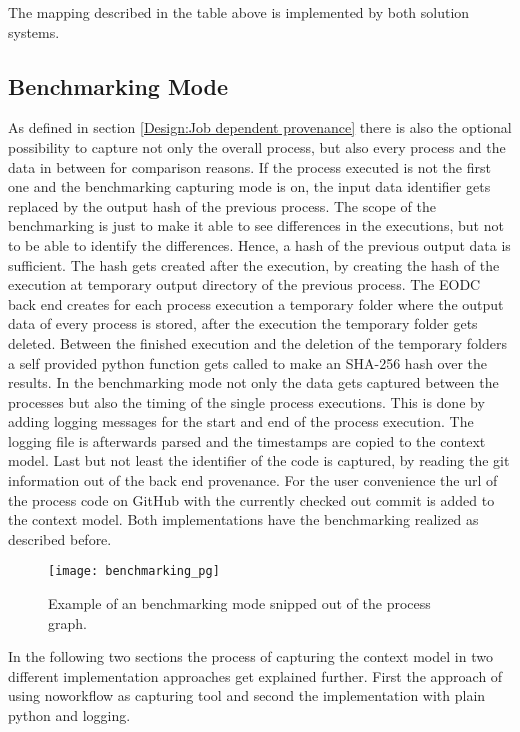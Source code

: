 \documentclass[draft,final]{vutinfth} %
\begin{document}
The mapping described in the table above is implemented by both solution systems. 

\subsection{Benchmarking Mode}\label{Implementation:Benchmarking Mode}
As defined in section \ref{Design:Job dependent provenance} there is also the optional possibility to capture not only the overall process, but also every process and the data in between for comparison reasons. 
If the process executed is not the first one and the benchmarking capturing mode is on, the input data identifier gets replaced by the output hash of the previous process. The scope of the benchmarking is just to make it able to see differences in the executions, but not to be able to identify the differences. Hence, a hash of the previous output data is sufficient. The hash gets created after the execution, by creating the hash of the execution at temporary output directory of the previous process. The EODC back end creates for each process execution a temporary folder where the output data of every process is stored, after the execution the temporary folder gets deleted. Between the finished execution and the deletion of the temporary folders a self provided python function gets called to make an SHA-256 hash over the results. In the benchmarking mode not only the data gets captured between the processes but also the timing of the single process executions. This is done by adding logging messages for the start and end of the process execution. The logging file is afterwards parsed and the timestamps are copied to the context model. Last but not least the identifier of the code is captured, by reading the git information out of the back end provenance. For the user convenience the url of the process code on GitHub with the currently checked out commit is added to the context model. Both implementations have the benchmarking realized as described before.    

\begin{figure}[h]
	\centering
	\texttt{[image: benchmarking\_pg]}
	\caption{Example of an benchmarking mode snipped out of the process graph.}
	\label{fig:benchmarking_pg} %
\end{figure}

In the following two sections the process of capturing the context model in two different implementation approaches get explained further. First the approach of using noworkflow as capturing tool and second the implementation with plain python and logging. 
\end{document}
